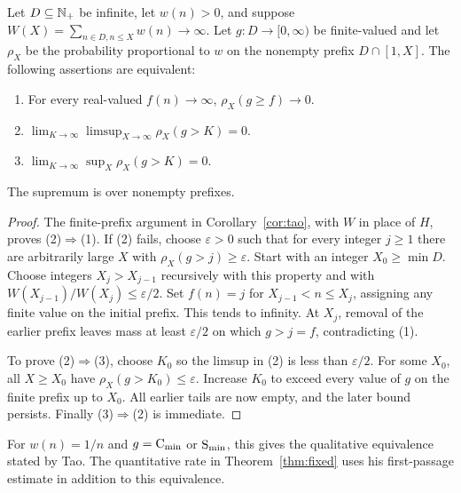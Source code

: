 \begin{proposition}\label{prop:tightness}
Let $D\subseteq\mathbb N_+$ be infinite, let $w(n)>0$, and suppose
$W(X)=\sum_{n\in D,n\leq X}w(n)\to\infty$.
Let $g:D\to[0,\infty)$ be finite-valued and let $\rho_X$ be the
probability proportional to $w$ on the nonempty prefix $D\cap[1,X]$.
The following assertions are equivalent:
\begin{enumerate}
\item For every real-valued $f(n)\to\infty$, $\rho_X(g\geq f)\to0$.
\item $\displaystyle\lim_{K\to\infty}\limsup_{X\to\infty}\rho_X(g>K)=0$.
\item $\displaystyle\lim_{K\to\infty}\sup_X\rho_X(g>K)=0$.
\end{enumerate}
The supremum is over nonempty prefixes.
\end{proposition}
\begin{proof}
The finite-prefix argument in Corollary~\ref{cor:tao}, with $W$ in place
of $H$, proves (2)$\Rightarrow$(1).
If (2) fails, choose $\varepsilon>0$ such that for every integer $j\geq1$
there are arbitrarily large $X$ with $\rho_X(g>j)\geq\varepsilon$.
Start with an integer $X_0\geq\min D$.
Choose integers $X_j>X_{j-1}$ recursively with this property and with
$W(X_{j-1})/W(X_j)\leq\varepsilon/2$.  Set $f(n)=j$ for
$X_{j-1}<n\leq X_j$, assigning any finite value on the initial prefix.
This tends to infinity.  At $X_j$, removal of the earlier prefix leaves
mass at least $\varepsilon/2$ on which $g>j=f$, contradicting (1).

To prove (2)$\Rightarrow$(3), choose $K_0$ so the limsup in (2) is less
than $\varepsilon/2$.  For some $X_0$, all $X\geq X_0$ have
$\rho_X(g>K_0)\leq\varepsilon$.  Increase $K_0$ to exceed every value
of $g$ on the finite prefix up to $X_0$.  All earlier tails are now empty,
and the later bound persists.  Finally (3)$\Rightarrow$(2) is immediate.
\end{proof}

For $w(n)=1/n$ and $g=\mathrm C_{\min}$ or $\mathrm S_{\min}$, this gives the
qualitative equivalence stated by Tao.  The quantitative rate in
Theorem~\ref{thm:fixed} uses his first-passage estimate in addition to
this equivalence.
